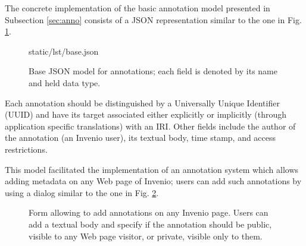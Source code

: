 
The concrete implementation of the basic annotation model presented in
Subsection \ref{sec:anno} consists of a JSON representation similar to the one
in Fig. \ref{lst:basejson}.

\begin{figure}[!ht]
  
    {static/lst/base.json}
  \caption[Base JSON model for annotations]
          {Base JSON model for annotations; each field is denoted by its name
           and held data type.}
  \label{lst:basejson}
\end{figure}

Each annotation should be distinguished by a Universally Unique Identifier
(UUID) and have its target associated either explicitly or implicitly (through
application specific translations) with an IRI. Other fields include the author
of the annotation (an Invenio user), its textual body, time stamp, and access
restrictions.

This model facilitated the implementation of an annotation system which allows
adding metadata on any Web page of Invenio; users can add such annotations by
using a dialog similar to the one in Fig. \ref{fig:annoform}.

\begin{figure}
  \centering
  \caption[Form allowing to add annotations on any Invenio page]
          {Form allowing to add annotations on any Invenio page. Users can add
           a textual body and specify if the annotation should be public,
           visible to any Web page visitor, or private, visible only to them.}
  \label{fig:annoform}
\end{figure}

